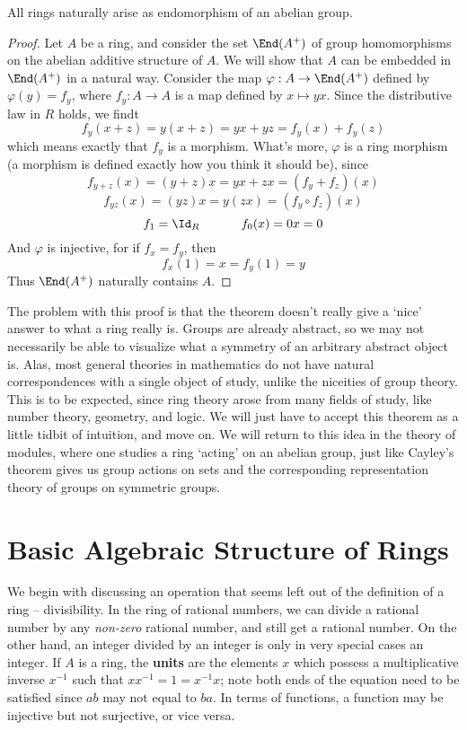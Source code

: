 \begin{theorem}
    All rings naturally arise as endomorphism of an abelian group.
\end{theorem}
\begin{proof}
    Let $A$ be a ring, and consider the set $\End(A^+)$ of group homomorphisms on the abelian additive structure of $A$. We will show that $A$ can be embedded in $\End(A^+)$ in a natural way. Consider the map $\varphi: A \to \End(A^+)$ defined by $\varphi(y) = f_y$, where $f_y:A \to A$ is a map defined by $x \mapsto yx$. Since the distributive law in $R$ holds, we findt
    \[ f_y(x + z) = y(x + z) = yx + yz = f_y(x) + f_y(z) \]
    which means exactly that $f_y$ is a morphism. What's more, $\varphi$ is a ring morphism (a morphism is defined exactly how you think it should be), since
    \[ f_{y + z}(x) = (y + z)x = yx + zx = (f_y + f_z)(x) \]
    \[ f_{yz}(x) = (yz)x = y(zx) = (f_y \circ f_z)(x) \]
    \[ f_1 = \Id_R\ \ \ \ \ \ \ \ \ \  f_0(x) = 0x = 0 \]
    And $\varphi$ is injective, for if $f_x = f_y$, then
    \[ f_x(1) = x = f_y(1) = y \]
    Thus $\End(A^+)$ naturally contains $A$.
\end{proof}

The problem with this proof is that the theorem doesn't really give a `nice' answer to what a ring really is. Groups are already abstract, so we may not necessarily be able to visualize what a symmetry of an arbitrary abstract object is. Alas, most general theories in mathematics do not have natural correspondences with a single object of study, unlike the niceities of group theory. This is to be expected, since ring theory arose from many fields of study, like number theory, geometry, and logic. We will just have to accept this theorem as a little tidbit of intuition, and move on. We will return to this idea in the theory of modules, where one studies a ring `acting' on an abelian group, just like Cayley's theorem gives us group actions on sets and the corresponding representation theory of groups on symmetric groups.

\section{Basic Algebraic Structure of Rings}

We begin with discussing an operation that seems left out of the definition of a ring -- divisibility. In the ring of rational numbers, we can divide a rational number by any {\it non-zero} rational number, and still get a rational number. On the other hand, an integer divided by an integer is only in very special cases an integer. If $A$ is a ring, the {\bf units} are the elements $x$ which possess a multiplicative inverse $x^{-1}$ such that $xx^{-1} = 1 = x^{-1}x$; note both ends of the equation need to be satisfied since $ab$ may not equal to $ba$. In terms of functions, a function may be injective but not surjective, or vice versa.

